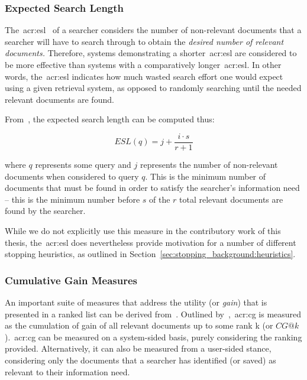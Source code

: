 \subsubsection{Expected Search Length}\label{sec:ir_background:evaluation:system:esl}
The~\gls{acr:esl}~\citep{cooper1968expected_search_length} of a searcher considers the number of non-relevant documents that a searcher will have to search through to obtain the \emph{desired number of relevant documents.} Therefore, systems demonstrating a shorter~\gls{acr:esl} are considered to be more effective than systems with a comparatively longer~\gls{acr:esl}. In other words, the~\gls{acr:esl} indicates how much wasted search effort one would expect using a given retrieval system, as opposed to randomly searching until the needed relevant documents are found.

From~\cite{cooper1968expected_search_length}, the expected search length can be computed thus:

\begin{equation}
ESL(q) = j + \frac{i \cdot s}{r + 1}
\end{equation}

\noindent
where $q$ represents some query and $j$ represents the number of non-relevant documents when considered to query $q$. This is the minimum number of documents that must be found in order to satisfy the searcher's information need -- this is the minimum number before $s$ of the $r$ total relevant documents are found by the searcher.

While we do not explicitly use this measure in the contributory work of this thesis, the~\gls{acr:esl} does nevertheless provide motivation for a number of different stopping heuristics, as outlined in Section~\ref{sec:stopping_background:heuristics}.

\subsubsection{Cumulative Gain Measures}\label{sec:ir_background:evaluation:system:cg}
An important suite of measures that address the utility (or \emph{gain}) that is presented in a ranked list can be derived from~. Outlined by~\cite{jarvelin2000cg, jarvelin2002cg},~\gls{acr:cg} is measured as the cumulation of gain of all relevant documents up to some rank k (or $CG@k$).~\gls{acr:cg} can be measured on a system-sided basis, purely considering the ranking provided. Alternatively, it can also be measured from a user-sided stance, considering only the documents that a searcher has identified (or saved) as relevant to their information need.

